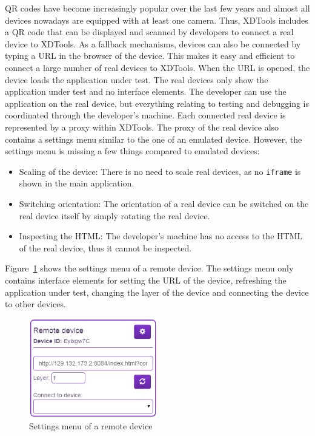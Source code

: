 QR codes have become increasingly popular over the last few years and almost all devices nowadays are equipped with at least one camera. Thus, XDTools includes a QR code that can be displayed and scanned by developers to connect a real device to XDTools. As a fallback mechanisms, devices can also be connected by typing a URL in the browser of the device. This makes it easy and efficient to connect a large number of real devices to XDTools. When the URL is opened, the device loads the application under test. The real devices only show the application under test and no interface elements. The developer can use the application on the real device, but everything relating to testing and debugging is coordinated through the developer's machine. Each connected real device is represented by a proxy within XDTools. The proxy of the real device also contains a settings menu similar to the one of an emulated device. However, the settings menu is missing a few things compared to emulated devices:
\begin{itemize}
	\item Scaling of the device: There is no need to scale real devices, as no \lstinline|iframe| is shown in the main application.
	\item Switching orientation: The orientation of a real device can be switched on the real device itself by simply rotating the real device.
	\item Inspecting the HTML: The developer's machine has no access to the HTML of the real device, thus it cannot be inspected.
\end{itemize}
Figure~\ref{fig:settings_menu_remote} shows the settings menu of a remote device. The settings menu only contains interface elements for setting the URL of the device, refreshing the application under test, changing the layer of the device and connecting the device to other devices.

\begin{figure}[H]
  \centering
    \includegraphics[width=0.5\textwidth]{images/screenshots/remote_device.png}
	\caption[Screenshot: Settings menu remote device]{Settings menu of a remote device}
	\label{fig:settings_menu_remote}
\end{figure}

